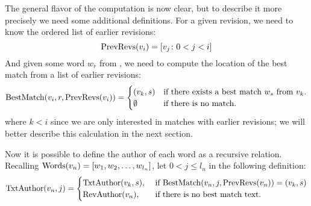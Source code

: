 The general flavor of the computation is now clear, but to describe it
more precisely we need some additional definitions.
For a given revision, we need to know the ordered list of earlier
revisions:
\begin{equation*}
    \mathrm{PrevRevs}(v_{i}) = \left[ v_{j} \colon  0 < j < i \right]
\end{equation*}
And given some word $w_r$ from , we need to compute the
location of the best match from a list of earlier revisions:
\begin{equation}
    \match{\version{i}, r, \prevrevs{\version{i}}} =
    \begin{cases}
	(\version{k}, s) & \text{if there exists a best match $w_s$ from \version{k}.} \\
	\emptyset & \text{if there is no match.} \\
    \end{cases}
\label{eq:bestmatch}
\end{equation}
where $k < i$ since we are only interested in matches with earlier revisions;
we will better describe this calculation in the next section.

Now it is possible to define the author of each word as a recursive relation.
Recalling $\mathrm{Words}(v_{n}) = \left[ w_1, w_2, \ldots, w_{l_n} \right]$, let $0 < j \le l_n$ in the following definition:
\begin{equation}
\txtauthor{\version{n}, j} =
    \begin{cases}
	\txtauthor{\version{k}, s}, & \text{ if }
	\match{\version{n}, j, \prevrevs{\version{n}}} = (\version{k}, s) \\
	\revauthor{\version{n}}, & \text{ if there is no best match text. } \\
    \end{cases}
\label{eq:txtauthor}
\end{equation}

